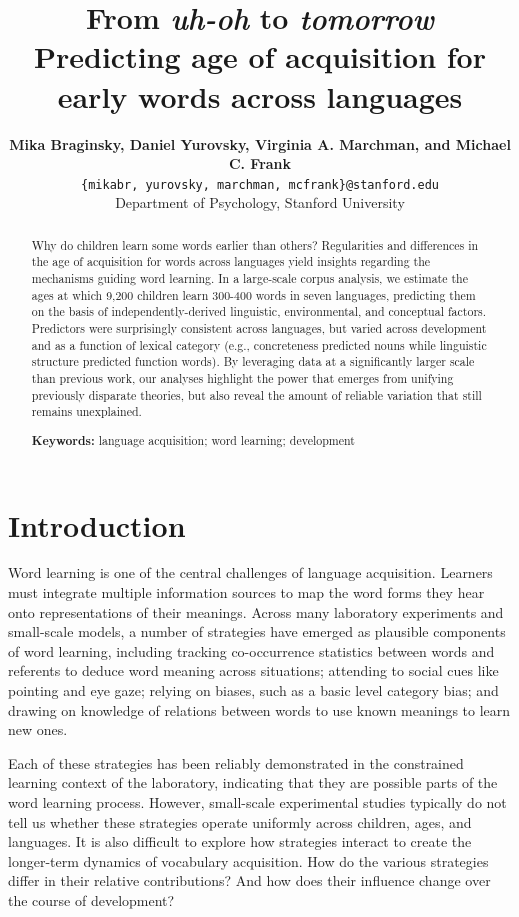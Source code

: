 \documentclass[10pt, letterpaper]{article}
\title{From \emph{uh-oh} to \emph{tomorrow}\\Predicting age of acquisition for
early words across languages}
\author{{\large \bf Mika Braginsky, Daniel Yurovsky, Virginia A. Marchman, and Michael C. Frank} \\ \texttt{\{mikabr, yurovsky, marchman, mcfrank\}@stanford.edu} \\ Department of Psychology, Stanford University}
\begin{document}
\maketitle

\begin{abstract}
Why do children learn some words earlier than others? Regularities and
differences in the age of acquisition for words across languages yield
insights regarding the mechanisms guiding word learning. In a
large-scale corpus analysis, we estimate the ages at which 9,200
children learn 300-400 words in seven languages, predicting them on the
basis of independently-derived linguistic, environmental, and conceptual
factors. Predictors were surprisingly consistent across languages, but
varied across development and as a function of lexical category (e.g.,
concreteness predicted nouns while linguistic structure predicted
function words). By leveraging data at a significantly larger scale than
previous work, our analyses highlight the power that emerges from
unifying previously disparate theories, but also reveal the amount of
reliable variation that still remains unexplained.

\textbf{Keywords:}
language acquisition; word learning; development
\end{abstract}

\setlength{\dbltextfloatsep}{10pt plus 1.0pt minus 2.0pt}

\section{Introduction}\label{introduction}

Word learning is one of the central challenges of language acquisition.
Learners must integrate multiple information sources to map the word
forms they hear onto representations of their meanings. Across many
laboratory experiments and small-scale models, a number of strategies
have emerged as plausible components of word learning, including
tracking co-occurrence statistics between words and referents to deduce
word meaning across situations; attending to social cues like pointing
and eye gaze; relying on biases, such as a basic level category bias;
and drawing on knowledge of relations between words to use known
meanings to learn new ones.

Each of these strategies has been reliably demonstrated in the
constrained learning context of the laboratory, indicating that they are
possible parts of the word learning process. However, small-scale
experimental studies typically do not tell us whether these strategies
operate uniformly across children, ages, and languages. It is also
difficult to explore how strategies interact to create the longer-term
dynamics of vocabulary acquisition. How do the various strategies differ
in their relative contributions? And how does their influence change
over the course of development?
\end{document}
